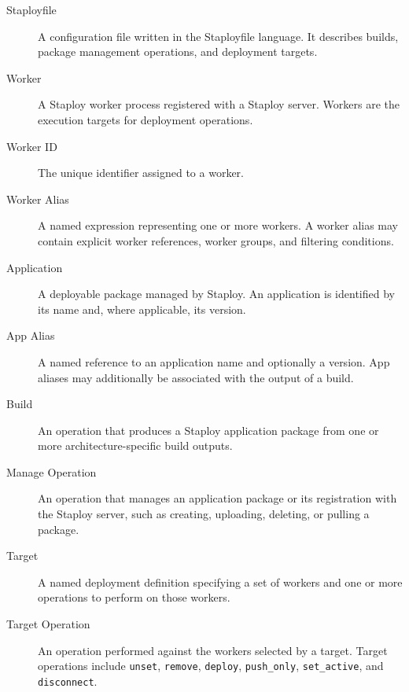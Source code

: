 \documentclass[11pt,a4paper]{article}
\begin{document}
    \begin{description}
        \item[Staployfile]
        A configuration file written in the Staployfile language.
        It describes builds, package management operations, and deployment targets.

        \item[Worker]
        A Staploy worker process registered with a Staploy server.
        Workers are the execution targets for deployment operations.

        \item[Worker ID]
        The unique identifier assigned to a worker.

        \item[Worker Alias]
        A named expression representing one or more workers.
        A worker alias may contain explicit worker references, worker groups, and filtering
        conditions.

        \item[Application]
        A deployable package managed by Staploy.
        An application is identified by its name and, where applicable, its version.

        \item[App Alias]
        A named reference to an application name and optionally a version.
        App aliases may additionally be associated with the output of a build.

        \item[Build]
        An operation that produces a Staploy application package from one or
        more architecture-specific build outputs.

        \item[Manage Operation]
        An operation that manages an application package or its registration
        with the Staploy server, such as creating, uploading, deleting, or
        pulling a package.

        \item[Target]
        A named deployment definition specifying a set of workers and one or
        more operations to perform on those workers.

        \item[Target Operation]
        An operation performed against the workers selected by a target.
        Target operations include \texttt{unset}, \texttt{remove},
        \texttt{deploy}, \texttt{push\_only}, \texttt{set\_active}, and
        \texttt{disconnect}.


\end{description}
\end{document}
